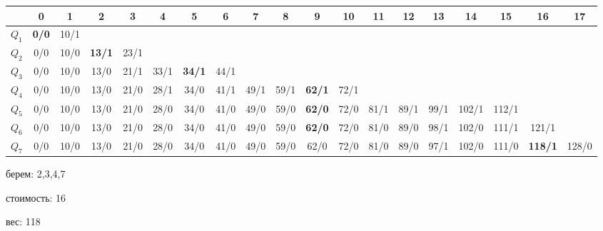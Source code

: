 \documentclass[russian]{article}
\begin{document}
\begin{tabular}{|@{}c@{}|@{}c@{}|@{}c@{}|@{}c@{}|@{}c@{}|@{}c@{}|@{}c@{}|@{}c@{}|@{}c@{}|@{}c@{}|@{}c@{}|@{}c@{}|@{}c@{}|@{}c@{}|@{}c@{}|@{}c@{}|@{}c@{}|@{}c@{}|@{}c@{}|}\hline
      & 0 & 1      & 2      & 3      & 4      & 5      & 6      & 7      & 8      & 9      & 10     & 11     & 12     & 13     & 14      & 15      & 16 & 17 \\\hline
$Q_1$ & {\bf 0/0} & 10/1 &        &        &        &        &        &        &        &        &        &        &        &        &         &         &         & \\\hline
$Q_2$ & 0/0 & 10/0 & {\bf 13/1} & 23/1 &        &        &        &        &        &        &        &        &        &        &         &         &         & \\\hline
$Q_3$ & 0/0 & 10/0 & 13/0 & 21/1 & 33/1 & {\bf 34/1} & 44/1 &        &        &        &        &        &        &        &         &         &         & \\\hline
$Q_4$ & 0/0 & 10/0 & 13/0 & 21/0 & 28/1 & 34/0 & 41/1 & 49/1 & 59/1 & {\bf 62/1 } & 72/1 &        &        &        &         &         &         & \\\hline
$Q_5$ & 0/0 & 10/0 & 13/0 & 21/0 & 28/0 & 34/0 & 41/0 & 49/0 & 59/0 & {\bf 62/0 } & 72/0 & 81/1 & 89/1 & 99/1 & 102/1 & 112/1 &         & \\\hline
$Q_6$ & 0/0 & 10/0 & 13/0 & 21/0 & 28/0 & 34/0 & 41/0 & 49/0 & 59/0 & {\bf 62/0 }& 72/0 & 81/0 & 89/0 & 98/1 & 102/0 & 111/1 & 121/1 & \\\hline
$Q_7$ & 0/0 & 10/0 & 13/0 & 21/0 & 28/0 & 34/0 & 41/0 & 49/0 & 59/0 & 62/0 & 72/0 & 81/0 & 89/0 & 97/1 & 102/0 & 111/0 & {\bf 118/1} & 128/0 \\\hline
\end{tabular}

берем: 2,3,4,7

стоимость: 16

вес: 118
\end{document}
